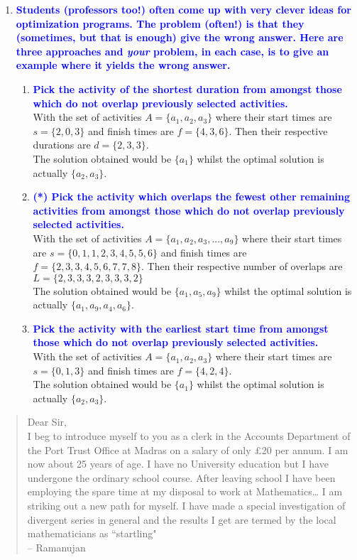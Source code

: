 \documentclass[11pt]{article}
\begin{document}
\begin{enumerate}
\item \textbf{\textcolor{blue}{Students (professors too!) often come up with very clever ideas for
optimization programs.  The problem (often!) is that they (sometimes, but that
is enough) give the wrong answer.  Here are three approaches and {\em your} problem,
in each case, is to give an example where it yields the wrong answer.}}
    \begin{enumerate}
    \item \textbf{\textcolor{blue}{Pick the activity of the shortest duration 
    from amongst those which do not overlap previously selected activities.}}
        \\ With the set of activities $A = \{a_1, a_2, a_3\}$ where their start times are $s = \{2, 0, 3\}$ and finish times are $f = \{4, 3, 6\}$. Then their respective durations are $d = \{2, 3, 3\}$.
        \\ The solution obtained would be $\{a_1\}$ whilst the optimal solution is actually $\{a_2, a_3\}$.
    \item \textbf{\textcolor{blue}{(*) Pick the activity which overlaps the fewest other remaining activities
    from amongst those which do not overlap previously selected activities.}}
        \\ With the set of activities $A = \{a_1, a_2, a_3, ..., a_9\}$ where their start times are $s = \{0, 1, 1, 2, 3, 4, 5, 5, 6\}$ and finish times are $f = \{2, 3, 3, 4, 5, 6, 7, 7, 8\}$. Then their respective number of overlaps are $L = \{2, 3, 3, 3, 2, 3, 3, 3, 2\}$
        \\ The solution obtained would be $\{a_1, a_5, a_9\}$ whilst the optimal solution is actually $\{a_1, a_9, a_4, a_6\}$.
    \item \textbf{\textcolor{blue}{Pick the activity with the earliest start time
    from amongst those which do not overlap previously selected activities.}}
        \\ With the set of activities $A = \{a_1, a_2, a_3\}$ where their start times are $s = \{0, 1, 3\}$ and finish times are $f = \{4, 2, 4\}$.
        \\ The solution obtained would be $\{a_1\}$ whilst the optimal solution is actually $\{a_2, a_3\}$.
    \end{enumerate}
\end{enumerate}

\begin{quote}
Dear Sir,
\\  I beg to introduce myself to you as a clerk in the Accounts Department
of the Port Trust Office at Madras on a salary of only \pounds 20 per
annum.  I am now about 25 years of age.  I have no University education but
I have undergone the ordinary school course.  After leaving school I have
been employing the spare time at my disposal to work at Mathematics\ldots
I am striking out a new path for myself.  I have made a special investigation
of divergent series in general and the results I get are termed
by the local mathematicians as ``startling"  \\ -- Ramanujan
\end{quote}
\end{document}
